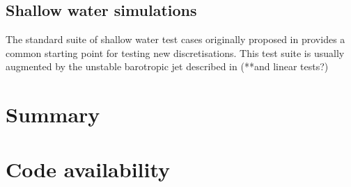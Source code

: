 \documentclass[11pt, a4paper]{article}
\begin{document}
\subsection{Shallow water simulations}
The standard suite of shallow water test cases originally proposed in
\citet{williamson1992standard} provides a common starting point for
testing new discretisations. This test suite is usually augmented by
the unstable barotropic jet described in \citet{galewsky2004initial}
(**and linear tests?)





\section{Summary}
\label{sec: summary}

\section{Code availability}


\end{document}

